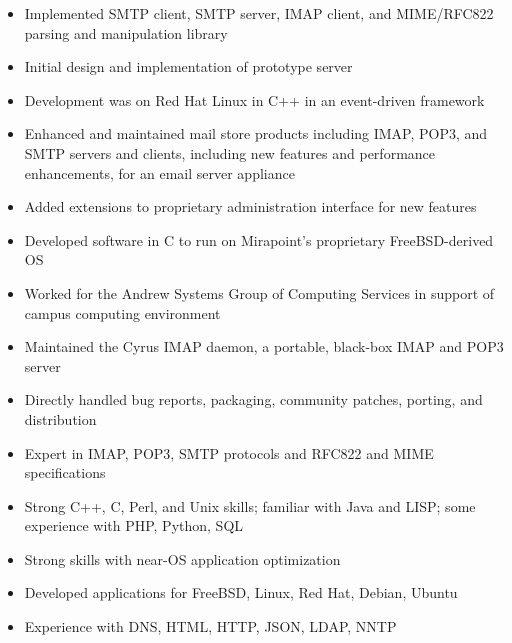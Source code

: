 \documentclass[letterpaper,12pt,twoside]{article}
\begin{document}
\vspace{-11pt}
\begin{itemize}
\item Implemented SMTP client, SMTP server, IMAP client, and
  MIME/RFC822 parsing and manipulation library
\item Initial design and implementation of prototype server
\item Development was on Red Hat Linux in C++ in an event-driven framework
\end{itemize}

\pagebreak

\vspace{-11pt}
\begin{itemize}
\item Enhanced and maintained mail store products including
  IMAP, POP3, and SMTP servers and clients, including new features
  and performance enhancements, for an email server appliance
\item Added extensions to proprietary administration interface for new
  features
\item Developed software in C to run on Mirapoint’s proprietary
  FreeBSD-derived OS
\end{itemize}

\vspace{-11pt}
\begin{itemize}
\item Worked for the Andrew Systems Group of Computing Services in
  support of campus computing environment
\item Maintained the Cyrus IMAP daemon, a portable, black-box IMAP and
  POP3 server
\item Directly handled bug reports, packaging, community patches,
  porting, and distribution
\end{itemize}


\vspace{-6pt}
\begin{itemize}
\item Expert in IMAP, POP3, SMTP protocols and RFC822 and MIME specifications
\item Strong C++, C, Perl, and Unix skills; familiar with Java and
  LISP; some experience with PHP, Python, SQL
\item Strong skills with near-OS application optimization
\item Developed applications for FreeBSD, Linux, Red Hat, Debian, Ubuntu
\item Experience with DNS, HTML, HTTP, JSON, LDAP, NNTP
\end{itemize}
\end{document}
